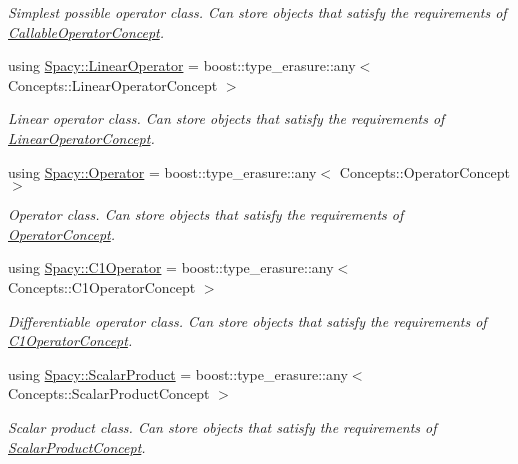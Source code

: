 \begin{DoxyCompactItemize}
\begin{DoxyCompactList}\small\item\em Simplest possible operator class. Can store objects that satisfy the requirements of \hyperlink{group__ConceptGroup_gadec0c664abaacc2065dadd8b11cc8d30_CallableOperatorConceptAnchor}{Callable\+Operator\+Concept}. \end{DoxyCompactList}\item 
using \hyperlink{group__SpacyGroup_ga584f7b9d82a844302ba0d77c3a1b6640_ga584f7b9d82a844302ba0d77c3a1b6640}{Spacy\+::\+Linear\+Operator} = boost\+::type\+\_\+erasure\+::any$<$ Concepts\+::\+Linear\+Operator\+Concept $>$
\begin{DoxyCompactList}\small\item\em Linear operator class. Can store objects that satisfy the requirements of \hyperlink{group__ConceptGroup_gaf0e18e41c434cfceb77ccb8e785a8055_LinearOperatorConceptAnchor}{Linear\+Operator\+Concept}. \end{DoxyCompactList}\item 
using \hyperlink{group__SpacyGroup_ga3f89622eba80cf840b2a7102f1303455_ga3f89622eba80cf840b2a7102f1303455}{Spacy\+::\+Operator} = boost\+::type\+\_\+erasure\+::any$<$ Concepts\+::\+Operator\+Concept $>$
\begin{DoxyCompactList}\small\item\em Operator class. Can store objects that satisfy the requirements of \hyperlink{group__ConceptGroup_ga7d984281b647a6d8e4c0a7ea5faeb90e_OperatorConceptAnchor}{Operator\+Concept}. \end{DoxyCompactList}\item 
using \hyperlink{group__SpacyGroup_ga87ae8cb0d7a567a4bb181e0a9f182620_ga87ae8cb0d7a567a4bb181e0a9f182620}{Spacy\+::\+C1\+Operator} = boost\+::type\+\_\+erasure\+::any$<$ Concepts\+::\+C1\+Operator\+Concept $>$
\begin{DoxyCompactList}\small\item\em Differentiable operator class. Can store objects that satisfy the requirements of \hyperlink{group__ConceptGroup_ga14a12c741dc237e32862fa4bc315451b_C1OperatorConceptAnchor}{C1\+Operator\+Concept}. \end{DoxyCompactList}\item 
using \hyperlink{group__SpacyGroup_ga9fe0b4de20da1ab1ca3d04a0f96343e1_ga9fe0b4de20da1ab1ca3d04a0f96343e1}{Spacy\+::\+Scalar\+Product} = boost\+::type\+\_\+erasure\+::any$<$ Concepts\+::\+Scalar\+Product\+Concept $>$
\begin{DoxyCompactList}\small\item\em Scalar product class. Can store objects that satisfy the requirements of \hyperlink{group__ConceptGroup_ga1308724cda3078f228fb05c29556805d_ScalarProductConceptAnchor}{Scalar\+Product\+Concept}. \end{DoxyCompactList}\item 

\end{DoxyCompactItemize}
